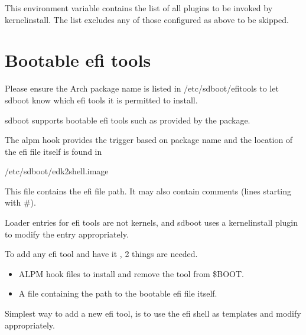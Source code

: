 \documentclass[letterpaper,11pt,english]{sphinxmanual}
\begin{document}
\sphinxAtStartPar
This environment variable contains the list of all plugins to be invoked by kernel\sphinxhyphen{}install.
The list excludes any of those configured as above to be skipped.

\sphinxstepscope


\chapter{Bootable efi tools}
\label{\detokenize{Efi-Tools:bootable-efi-tools}}\label{\detokenize{Efi-Tools::doc}}
\sphinxAtStartPar
Please ensure the Arch package name is listed in /etc/sd\sphinxhyphen{}boot/efi\sphinxhyphen{}tools to let sd\sphinxhyphen{}boot
know which efi tools it is permitted to install.

\sphinxAtStartPar
sd\sphinxhyphen{}boot supports bootable efi tools such as  provided by the  package.

\sphinxAtStartPar
The alpm hook  provides the trigger based on package name
and the location of the efi file itself is found in

\begin{sphinxVerbatim}[commandchars=\\\{\}]
/etc/sd\PYGZhy{}boot/edk2\PYGZhy{}shell.image
\end{sphinxVerbatim}

\sphinxAtStartPar
This file contains the efi file path. It may also contain comments (lines starting with \#).

\sphinxAtStartPar
Loader entries for efi tools are not kernels, and sd\sphinxhyphen{}boot uses a kernel\sphinxhyphen{}install plugin
to modify the entry appropriately.

\sphinxAtStartPar
To add any efi tool and have it , 2 things are needed.
\begin{itemize}
\item {} 
\sphinxAtStartPar
ALPM hook files to install and remove the tool from \$BOOT.

\item {} 
\sphinxAtStartPar
A file containing the path to the bootable efi file itself.

\end{itemize}

\sphinxAtStartPar
Simplest way to add a new efi tool, is to use the efi shell as templates and modify appropriately.
\end{document}
